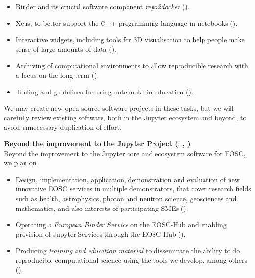 \begin{itemize}
  \item Binder and its crucial software component \emph{repo2docker}
    ().

  \item Xeus, to better support the C++ programming language in notebooks
    ().

  \item Interactive widgets, including tools for 3D visualisation to help
    people make sense of large amounts of data
    ().

  \item Archiving of computational environments to allow reproducible research
    with a focus on the long term ().

  \item Tooling and guidelines
    for using notebooks in education
    ().

\end{itemize}

We may create new open source software projects in these tasks,
but we will carefully review existing software, both in the
Jupyter ecosystem and beyond, to avoid unnecessary duplication of effort.

\medskip\noindent\textbf{Beyond the improvement to the Jupyter Project
  (, , )}\\
Beyond the improvement to the Jupyter core and ecosystem software for EOSC, we plan on
\begin{itemize}
\item Design, implementation, application, demonstration and
  evaluation of new innovative EOSC services
  in multiple demonstrators, that cover research fields such as
  health, astrophysics, photon and neutron science, geosciences and
  mathematics, and also interests of participating SMEs ().
\item Operating a \emph{European Binder Service} on the EOSC-Hub and
  enabling provision of Jupyter Services through the EOSC-Hub ().
\item Producing \emph{training and education material} to disseminate
  the ability to do reproducible computational science using the tools
  we develop, among others ().
\end{itemize}

